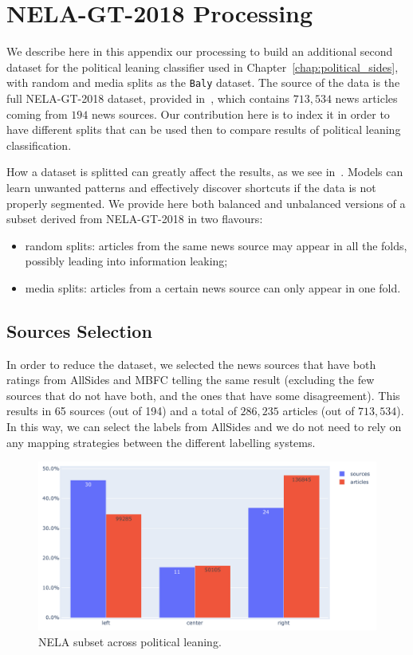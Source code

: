 \chapter{NELA-GT-2018 Processing}
\label{app:nela_processing}

We describe here in this appendix our processing to build an additional second dataset for the political leaning classifier used in Chapter~\ref{chap:political_sides}, with random and media splits as the \texttt{Baly} dataset.
The source of the data is the full NELA-GT-2018 dataset, provided in~\citet{DVN/ULHLCB_2019}, which contains $713,534$ news articles coming from $194$ news sources.
Our contribution here is to index it in order to have different splits that can be used then to compare results of political leaning classification.

How a dataset is splitted can greatly affect the results, as we see in~\citet{baly2020we}. Models can learn unwanted patterns and effectively discover shortcuts if the data is not properly segmented.
We provide here both balanced and unbalanced versions of a subset derived from NELA-GT-2018 in two flavours:

\begin{itemize}
    \item random splits: articles from the same news source may appear in all the folds, possibly leading into information leaking;
    \item media splits: articles from a certain news source can only appear in one fold.
\end{itemize}

\section{Sources Selection}

In order to reduce the dataset, we selected the news sources that have both ratings from AllSides and MBFC telling the same result (excluding the few sources that do not have both, and the ones that have some disagreement).
This results in 65 sources (out of 194) and a total of $286,235$ articles (out of $713,534$).
In this way, we can select the labels from AllSides and we do not need to rely on any mapping strategies between the different labelling systems.

\begin{figure}[!htbp]
    \centering
    \includegraphics[width=\linewidth]{figures/nela_subset_allsides_simplified.pdf}
    \caption{NELA subset across political leaning.}
    \label{fig:nela_subset_allsides_simplified}
\end{figure}

